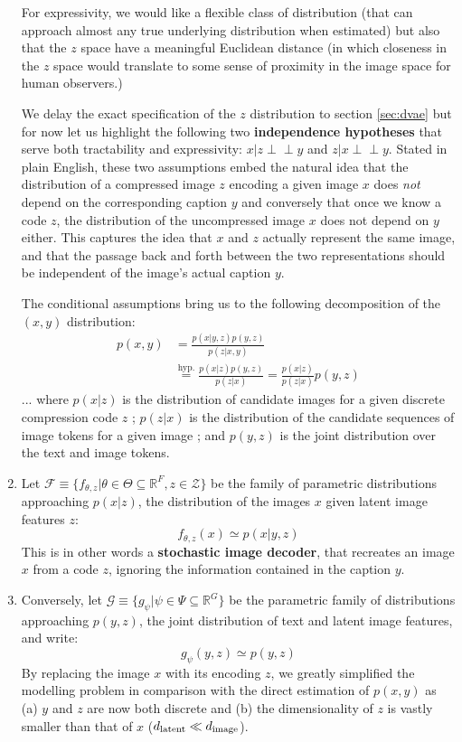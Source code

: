 \documentclass{article}
\begin{document}
\begin{multicols}{2}
\begin{enumerate}
    For expressivity, we would like a flexible class of distribution (that can approach almost any true underlying distribution when estimated) but also that the $z$ space have a meaningful Euclidean distance (in which closeness in the $z$ space would translate to some sense of proximity in the image space for human observers.)
    
    We delay the exact specification of the $z$ distribution to section \ref{sec:dvae} but for now let us highlight the following two \textbf{independence hypotheses} that serve both tractability and expressivity: $x|z \perp\!\!\!\perp y$ and $z|x \perp\!\!\!\perp y$.
    Stated in plain English, these two assumptions embed the natural idea that the distribution of a compressed image $z$ encoding a given image $x$ does \textit{not} depend on the corresponding caption $y$ and conversely that once we know a code $z$, the distribution of the uncompressed image $x$ does not depend on $y$ either.
    This captures the idea that $x$ and $z$ actually represent the same image, and that the passage back and forth between the two representations should be independent of the image's actual caption $y$.
    
    The conditional assumptions bring us to the following decomposition of the $(x,y)$ distribution:
    \begin{align*}
        p(x,y) & =\frac{p(x|y,z)p(y,z)}{p(z|x,y)} \\
        & \overset{\text{hyp.}}{=}\frac{p(x|z)p(y,z)}{p(z|x)}=\frac{p(x|z)}{p(z|x)}p(y,z)
    \end{align*}
    ... where $p(x|z)$ is the distribution of candidate images for a given discrete compression code $z$ ; $p(z|x)$ is the distribution of the candidate sequences of image tokens for a given image ; and $p(y,z)$ is the joint distribution over the text and image tokens.
    
    \item Let $\mathcal{F}\equiv\{f_{\theta,z}|\theta\in\Theta\subseteq\mathbb{R}^{F}, z\in\mathcal{Z}\}$ be the family of parametric distributions approaching $p(x|z)$, the distribution of the images $x$ given latent image features $z$:
    $$f_{\theta,z}(x) \simeq p(x |y,z)$$
    This is in other words a \textbf{stochastic image decoder}, that recreates an image $x$ from a code $z$, ignoring the information contained in the caption $y$.
    
    \item Conversely, let $\mathcal{G} \equiv \{g_{\psi} | \psi\in\Psi \subseteq \mathbb{R}^{G} \}$ be the parametric family of distributions approaching $p(y,z)$, the joint distribution of text and latent image features, and write:
    $$g_{\psi}(y,z)\simeq p(y,z)$$
    By replacing the image $x$ with its encoding $z$, we greatly simplified the modelling problem in comparison with the direct estimation of $p(x,y)$ as (a) $y$ and $z$ are now both discrete and (b) the dimensionality of $z$ is vastly smaller than that of $x$ (${d_{\mathrm{latent}}}\ll d_{\mathrm{image}}$).
    

\end{enumerate}
\end{multicols}
\end{document}
